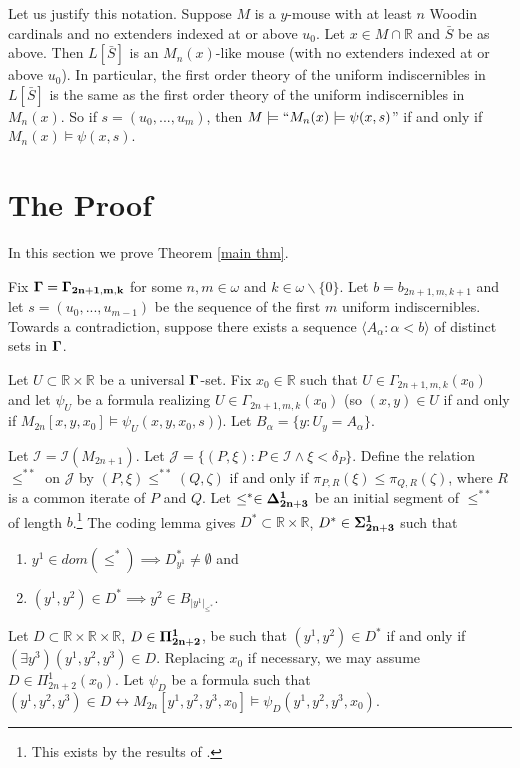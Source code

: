 \documentclass[12pt]{article}
\newcommand\I{\mathcal{I}}
\newcommand\J{\mathcal{J}}
\newcommand\R{\mathbb{R}}
\newcommand\Gam{\bf{\Gamma}}
\begin{document}
{Let us justify this notation. Suppose $M$ is a $y$-mouse with at least $n$ Woodin cardinals and no extenders indexed at or above $u_0$. Let $x\in M \cap \R$ and $\bar{S}$ be as above. Then $L[\bar{S}]$ is an $M_n(x)$-like mouse (with no extenders indexed at or above $u_0$). In particular, the first order theory of the uniform indiscernibles in $L[\bar{S}]$ is the same as the first order theory of the uniform indiscernibles in $M_n(x)$. So if $s = (u_0,..., u_m)$, then $M\models ``M_n(x) \models \psi(x,s)$'' if and only if $M_n(x) \models \psi(x,s)$.

\section{The Proof}

In this section we prove Theorem \ref{main thm}.

Fix $\Gam = \Gam_{2n+1,m,k}$ for some $n,m\in\omega$ and $k\in\omega\backslash\{0\}$. Let $b = b_{2n+1,m,k+1}$ and let $s = (u_0,...,u_{m-1})$ be the sequence of the first $m$ uniform indiscernibles. Towards a contradiction, suppose there exists a sequence $\langle A_\alpha : \alpha < b\rangle$ of distinct sets in $\Gam$.

Let $U\subset \R \times \R$ be a universal $\Gam$-set. Fix $x_0\in\R$ such that $U\in \Gamma_{2n+1,m,k}(x_0)$ and let $\psi_U$ be a formula realizing $U\in \Gamma_{2n+1,m,k}(x_0)$ (so $(x,y)\in U$ if and only if $M_{2n}[x,y,x_0]\models \psi_U(x,y,x_0,s)$). Let $B_\alpha = \{y: U_y = A_\alpha\}$.

Let $\I = \I(M_{2n+1})$. Let $\J = \{(P,\xi): P\in\I \wedge \xi < \delta_P\}$. Define the relation $\leq^{**}$ on $\J$ by $(P,\xi) \leq^{**} (Q,\zeta)$ if and only if $\pi_{P,R}(\xi)\leq \pi_{Q,R}(\zeta)$, where $R$ is a common iterate of $P$ and $Q$. Let $\leq^*\in\bf{\Delta^1_{2n+3}}$ be an initial segment of $\leq^{**}$ of length $b$.\footnote{This exists by the results of \cite{pwoim}.} The coding lemma gives $D^*\subset \R\times \R$, $D^*\in \bf{\Sigma^1_{2n+3}}$ such that
\begin{enumerate}
    \item $y^1\in dom(\leq^*) \implies D^*_{y^1} \neq \emptyset$ and
    \item $(y^1,y^2)\in D^* \implies y^2\in B_{|y^1|_{\leq^*}}$.    
\end{enumerate}
Let $D\subset \R\times\R\times\R$, $D\in \bf{\Pi^1_{2n+2}}$, be such that $(y^1,y^2)\in D^*$ if and only if $(\exists y^3)(y^1,y^2,y^3)\in D$. Replacing $x_0$ if necessary, we may assume $D\in \Pi^1_{2n+2}(x_0)$. Let $\psi_D$ be a formula such that $(y^1,y^2,y^3)\in D \longleftrightarrow M_{2n}[y^1,y^2,y^3,x_0] \models \psi_D(y^1,y^2,y^3,x_0)$.

}
\end{document}
